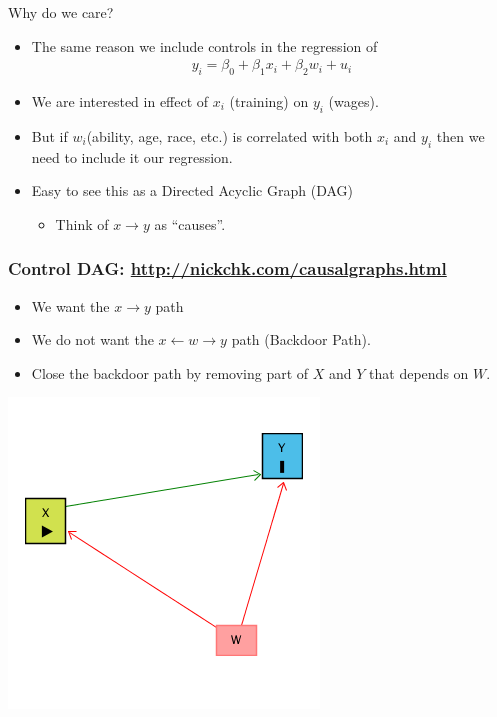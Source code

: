 \documentclass[xcolor=pdftex,dvipsnames,table,mathserif,aspectratio=169]{beamer}
\begin{document}
\begin{frame}{Why do we care?}
\begin{itemize}
\item The same reason we include \alert{controls} in the regression of
\begin{align*}
y_i = \beta_0 + \beta_1 x_i + \beta_2 w_i + u_i
\end{align*}
\item We are interested in effect of $x_i$ (training) on $y_i$ (wages).
\item But if $w_i$(ability, age, race, etc.) is correlated with both $x_i$ and $y_i$ then we need to include it our regression.
\item Easy to see this as a \alert{Directed Acyclic Graph} (DAG)
\begin{itemize}
\item Think of $x \rightarrow y$ as ``causes''.
\end{itemize}

\end{itemize}
\end{frame}

\begin{frame}
\frametitle{Control DAG: \url{http://nickchk.com/causalgraphs.html}}
\begin{itemize}
\item We want the $x \rightarrow y$ path
\item We do not want the $x \leftarrow w \rightarrow y$ path (\alert{Backdoor Path}).
\item Close the backdoor path by removing part of $X$ and $Y$ that depends on $W$.
\end{itemize}

\begin{center}
\includegraphics[height=0.8\textheight]{./resources/dag-control.png}
\end{center}
\end{frame}
\end{document}
